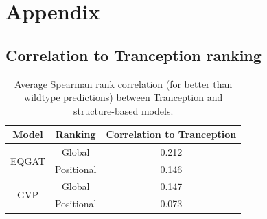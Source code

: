 \documentclass[12pt,a4paper]{report}
\begin{document}


\label{lastcontentpage} %



\clearpage


\appendix
\chapter{Appendix}
\section{Correlation to Tranception ranking}
\label{tranception-correlation}

\begin{table}[!h]
\centering
\caption{Average Spearman rank correlation (for better than wildtype predictions) between Tranception and structure-based models. }
\vskip 0.15in
\begin{tabular}{@{}ccc@{}}
\toprule
Model                  & Ranking    & Correlation to Tranception \\ \midrule
\multirow{2}{*}{EQGAT} & Global     & 0.212                      \\
                       & Positional & 0.146                      \\ \midrule
\multirow{2}{*}{GVP}   & Global     & 0.147                      \\
                       & Positional & 0.073                      \\ \bottomrule
\end{tabular}

\end{table}
\end{document}

